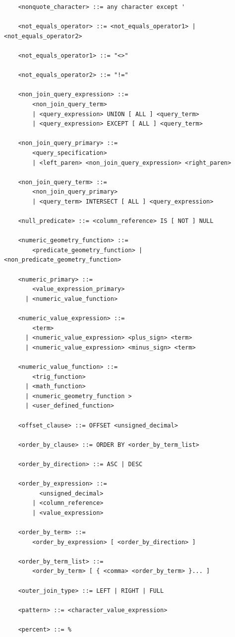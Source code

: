 \documentclass[11pt,a4paper]{ivoa}
\begin{document}
\begin{verbatim}
    <nonquote_character> ::= any character except '

    <not_equals_operator> ::= <not_equals_operator1> | <not_equals_operator2>

    <not_equals_operator1> ::= "<>"

    <not_equals_operator2> ::= "!="

    <non_join_query_expression> ::=
        <non_join_query_term>
        | <query_expression> UNION [ ALL ] <query_term>
        | <query_expression> EXCEPT [ ALL ] <query_term>

    <non_join_query_primary> ::=
        <query_specification>
        | <left_paren> <non_join_query_expression> <right_paren>

    <non_join_query_term> ::=
        <non_join_query_primary>
        | <query_term> INTERSECT [ ALL ] <query_expression>

    <null_predicate> ::= <column_reference> IS [ NOT ] NULL

    <numeric_geometry_function> ::=
        <predicate_geometry_function> | <non_predicate_geometry_function>

    <numeric_primary> ::=
        <value_expression_primary>
      | <numeric_value_function>

    <numeric_value_expression> ::=
        <term>
      | <numeric_value_expression> <plus_sign> <term>
      | <numeric_value_expression> <minus_sign> <term>

    <numeric_value_function> ::=
        <trig_function>
      | <math_function>
      | <numeric_geometry_function >
      | <user_defined_function>

    <offset_clause> ::= OFFSET <unsigned_decimal>

    <order_by_clause> ::= ORDER BY <order_by_term_list>

    <order_by_direction> ::= ASC | DESC

    <order_by_expression> ::=
          <unsigned_decimal>
        | <column_reference>
        | <value_expression>

    <order_by_term> ::=
        <order_by_expression> [ <order_by_direction> ]

    <order_by_term_list> ::=
        <order_by_term> [ { <comma> <order_by_term> }... ]

    <outer_join_type> ::= LEFT | RIGHT | FULL

    <pattern> ::= <character_value_expression>

    <percent> ::= %


\end{verbatim}
\end{document}
